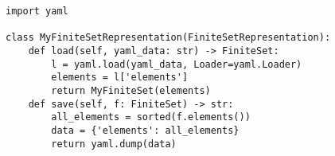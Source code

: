 \begin{minipage}{456pt}
\begin{verbatim}
import yaml

class MyFiniteSetRepresentation(FiniteSetRepresentation):
    def load(self, yaml_data: str) -> FiniteSet:
        l = yaml.load(yaml_data, Loader=yaml.Loader)
        elements = l['elements']
        return MyFiniteSet(elements)
    def save(self, f: FiniteSet) -> str:
        all_elements = sorted(f.elements())
        data = {'elements': all_elements}
        return yaml.dump(data)
\end{verbatim}
\end{minipage}